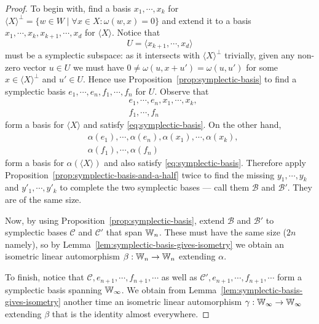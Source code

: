 \color{gray}
\begin{proof}
    To begin with, find a basis $x_1, \cdots, x_k$ for $\langle X \rangle^\perp = \{ w \in W \mid \forall x \in X : \omega(w, x) = 0 \}$ 
    and extend it to a basis \(
        x_1, \cdots, x_k, x_{k+1}, \cdots, x_d
    \) for $\langle X \rangle$.
    Notice that
    \[
        U = \langle x_{k+1}, \cdots, x_d \rangle
    \] must be a symplectic subspace:
    as it intersects with $\langle X \rangle^\perp$ trivially, 
    given any non-zero vector $u \in U$ we must have $0 \neq \omega(u, x + u') = \omega(u, u')$ for some $x \in \langle X \rangle^\perp$ and $u' \in U$.
    Hence use Proposition~\ref{prop:symplectic-basis} to find a symplectic basis
    \(
        e_1, \cdots, e_n,
        f_1, \cdots, f_n
    \)
    for $U$.
    Observe that 
    \begin{align*}
        &e_1, \cdots, e_n, x_1, \cdots, x_k, \\
        &f_1, \cdots, f_n
    \end{align*}
    form a basis for $\langle X \rangle$ and satisfy \eqref{eq:symplectic-basis}.
    On the other hand,
    \begin{align*}
        &\alpha(e_1), \cdots, \alpha(e_n), \alpha(x_1), \cdots, \alpha(x_k), \\
        &\alpha(f_1), \cdots, \alpha(f_n)
    \end{align*}
    form a basis for $\alpha(\langle X \rangle)$ and also satisfy \eqref{eq:symplectic-basis}.
    Therefore apply Proposition~\ref{prop:symplectic-basis-and-a-half} twice to find the missing 
    $y_1, \cdots, y_k$ and $y'_1, \cdots, y'_k$ to complete the two symplectic bases --- call them $\mathcal{B}$ and $\mathcal{B}'$.
    They are of the same size.

    Now, by using Proposition~\ref{prop:symplectic-basis}, extend $\mathcal{B}$ and $\mathcal{B}'$ to symplectic bases $\mathcal{C}$ and $\mathcal{C}'$ that span $\mathbb{W}_n$.
    These must have the same size ($2n$ namely), 
    so by Lemma~\ref{lem:symplectic-basis-gives-isometry} we obtain an isometric linear automorphism $\beta : \mathbb{W}_n \to \mathbb{W}_n$ extending $\alpha$.

    To finish, notice that $\mathcal{C}, e_{n+1}, \cdots, f_{n+1}, \cdots$ as well as $\mathcal{C}', e_{n+1}, \cdots, f_{n+1}, \cdots$ 
    form a symplectic basis spanning $\mathbb{W}_\infty$.
    We obtain from Lemma~\ref{lem:symplectic-basis-gives-isometry} another time an isometric linear automorphism $\gamma : \mathbb{W}_\infty \to \mathbb{W}_\infty$ extending $\beta$ 
    that is the identity almost everywhere.
\end{proof}
\color{black}


